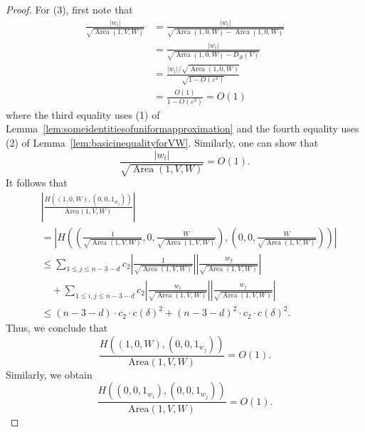 \documentclass[10pt,a4paper]{amsart}
\begin{document}
\begin{proof}
For (3), first note that
\begin{align*}
    \frac{|w_i|}{\sqrt{\operatorname{Area}(1,V,W)}} &= \frac{|w_i|}{\sqrt{\operatorname{Area}(1,0,W) - \operatorname{Area}(1,0,W)}} \\
    &= \frac{|w_i|}{\sqrt{\operatorname{Area}(1,0,W) - D_B(V)}}\\
    &= \frac{|w_i|/\sqrt{\operatorname{Area}(1,0,W)}}{\sqrt{1 - O(\varepsilon^2)}}\\
    &= \frac{O(1)}{1-O(\varepsilon^2)} = O(1)
\end{align*}
where the third equality uses (1) of Lemma~\ref{lem:someidentitiesofuniformapproximation} and the fourth equality uses (2) of Lemma~\ref{lem:basicinequalityforVW}.
Similarly, one can show that
$$
    \frac{|w_i|}{\sqrt{\operatorname{Area}(1,V,W)}}=O(1).
$$
It follows that
\begin{align*}
    &\left|\frac{H((1,0,W),(0,0,1_{w_j}))}{\mathrm{Area}(1,V,W)}\right| \\
    &= \left|H\left( \left(\frac{1}{\sqrt{\operatorname{Area}(1,V,W)}},0,\frac{W}{\sqrt{\operatorname{Area}(1,V,W)}}\right),\left(0,0,\frac{W}{\sqrt{\operatorname{Area}(1,V,W)}}\right)\right)\right|\\
    &\leq \sum_{1\leq j\leq n-3-d} c_2 \left|\frac{1}{\sqrt{\operatorname{Area}(1,V,W)}}\right| \left|\frac{w_j}{\sqrt{\operatorname{Area}(1,V,W)}}\right| \\
    &\quad + \sum_{1\leq i,j\leq n-3-d} c_2 \left|\frac{w_i}{\sqrt{\operatorname{Area}(1,V,W)}}\right| \left|\frac{w_j}{\sqrt{\operatorname{Area}(1,V,W)}}\right|\\
    &\leq (n-3-d)\cdot c_2\cdot c(\delta)^2 + (n-3-d)^2\cdot c_2\cdot c(\delta)^2.
\end{align*}
Thus, we conclude that 
$$
\frac{H((1,0,W),(0,0,1_{w_j}))}{\mathrm{Area}(1,V,W)} = O(1).
$$
Similarly, we obtain 
$$
\frac{H((0,0,1_{w_i}),(0,0,1_{w_j}))}{\mathrm{Area}(1,V,W)} = O(1).
$$
\end{proof}
\end{document}
